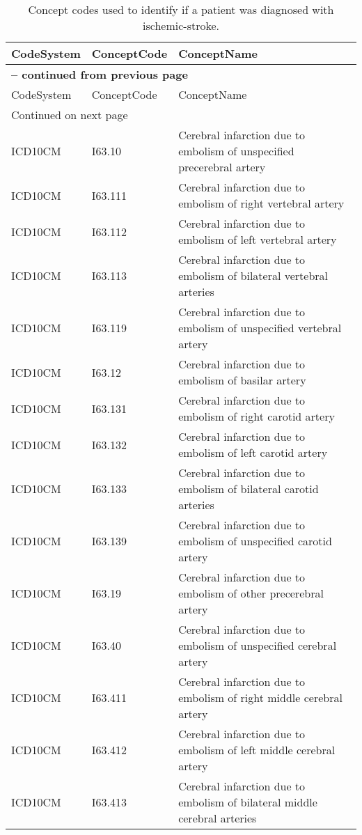 \begin{longtable}{p{}p{}p{}}
\caption{Concept codes used to identify if a patient was diagnosed with ischemic-stroke.} \\ 
 CodeSystem & ConceptCode & ConceptName \\ 
  \hline 
\endfirsthead 
\multicolumn{3}{p{\textwidth}}{{ \bfseries \tablename \thetable{} -- continued from previous page}} \\ 
\hline CodeSystem & ConceptCode & ConceptName \\ \hline 
\endhead 
\hline \multicolumn{3}{p{\textwidth}}{{Continued on next page}} \\ \hline 
\endfoot 
\hline 
\endlastfoot 
 \hline
ICD10CM & I63.10 & Cerebral infarction due to embolism of unspecified precerebral artery \\ 
  ICD10CM & I63.111 & Cerebral infarction due to embolism of right vertebral artery \\ 
  ICD10CM & I63.112 & Cerebral infarction due to embolism of left vertebral artery \\ 
  ICD10CM & I63.113 & Cerebral infarction due to embolism of bilateral vertebral arteries \\ 
  ICD10CM & I63.119 & Cerebral infarction due to embolism of unspecified vertebral artery \\ 
  ICD10CM & I63.12 & Cerebral infarction due to embolism of basilar artery \\ 
  ICD10CM & I63.131 & Cerebral infarction due to embolism of right carotid artery \\ 
  ICD10CM & I63.132 & Cerebral infarction due to embolism of left carotid artery \\ 
  ICD10CM & I63.133 & Cerebral infarction due to embolism of bilateral carotid arteries \\ 
  ICD10CM & I63.139 & Cerebral infarction due to embolism of unspecified carotid artery \\ 
  ICD10CM & I63.19 & Cerebral infarction due to embolism of other precerebral artery \\ 
  ICD10CM & I63.40 & Cerebral infarction due to embolism of unspecified cerebral artery \\ 
  ICD10CM & I63.411 & Cerebral infarction due to embolism of right middle cerebral artery \\ 
  ICD10CM & I63.412 & Cerebral infarction due to embolism of left middle cerebral artery \\ 
  ICD10CM & I63.413 & Cerebral infarction due to embolism of bilateral middle cerebral arteries \\ 

\end{longtable}
